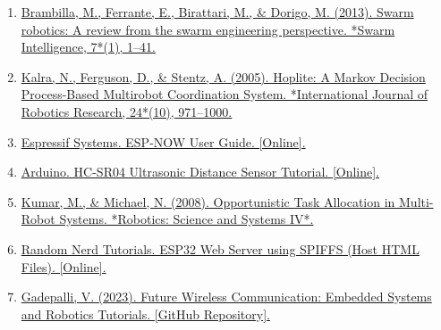 \documentclass[a4paper,12pt]{report}
\begin{document}
\begin{enumerate}
    \item \href{https://link.springer.com/article/10.1007/s11721-012-0075-2} {Brambilla, M., Ferrante, E., Birattari, M., \& Dorigo, M. (2013). Swarm robotics: A review from the swarm engineering perspective. *Swarm Intelligence, 7*(1), 1–41.}
    
    \item \href{https://www.researchgate.net/publication/2998069_Market-Based_Multirobot_Coordination_A_Survey_and_Analysis}{Kalra, N., Ferguson, D., \& Stentz, A. (2005). Hoplite: A Markov Decision Process-Based Multirobot Coordination System. *International Journal of Robotics Research, 24*(10), 971–1000.}
    
    \item \href{https://docs.espressif.com/projects/esp-idf/en/latest/esp32/api-reference/network/esp_now.html}{Espressif Systems. ESP-NOW User Guide. [Online].}
    
    \item \href{https://www.arduino.cc/en/Tutorial/UltrasonicSensor}{Arduino. HC-SR04 Ultrasonic Distance Sensor Tutorial. [Online].}
    
    \item\href{https://www.researchgate.net/publication/3930289_Distributed_multi-robot_task_allocation_for_emergency_handling}{Kumar, M., \& Michael, N. (2008). Opportunistic Task Allocation in Multi-Robot Systems. *Robotics: Science and Systems IV*.}
    
    \item \href{https://randomnerdtutorials.com/esp32-web-server-spiffs-spi-flash-file-system/}{Random Nerd Tutorials. ESP32 Web Server using SPIFFS (Host HTML Files). [Online].}
    
    \item \href{https://github.com/gadepall/fwc-1}{Gadepalli, V. (2023). Future Wireless Communication: Embedded Systems and Robotics Tutorials. [GitHub Repository].}
\end{enumerate}
\end{document}

